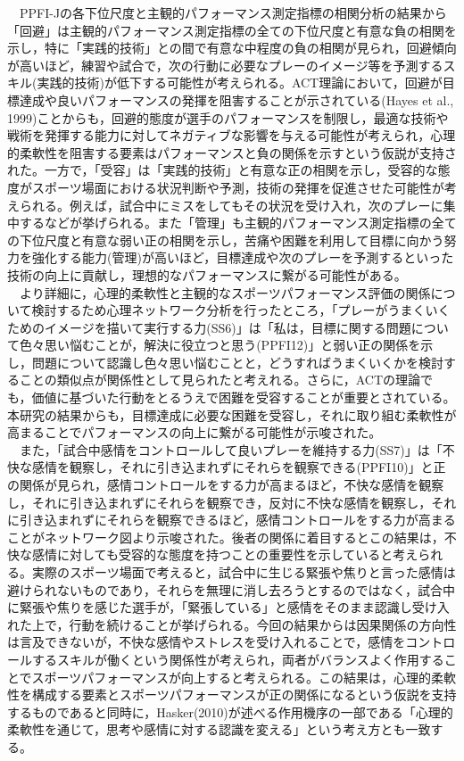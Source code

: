 \documentclass[12pt,a4paper,xelatex,ja=standard]{bxjsarticle}
\begin{document}
　PPFI-Jの各下位尺度と主観的パフォーマンス測定指標の相関分析の結果から「回避」は主観的パフォーマンス測定指標の全ての下位尺度と有意な負の相関を示し，特に「実践的技術」との間で有意な中程度の負の相関が見られ，回避傾向が高いほど，練習や試合で，次の行動に必要なプレーのイメージ等を予測するスキル(実践的技術)が低下する可能性が考えられる。ACT理論において，回避が目標達成や良いパフォーマンスの発揮を阻害することが示されている(Hayes
et al.,
1999)ことからも，回避的態度が選手のパフォーマンスを制限し，最適な技術や戦術を発揮する能力に対してネガティブな影響を与える可能性が考えられ，心理的柔軟性を阻害する要素はパフォーマンスと負の関係を示すという仮説が支持された。一方で，「受容」は「実践的技術」と有意な正の相関を示し，受容的な態度がスポーツ場面における状況判断や予測，技術の発揮を促進させた可能性が考えられる。例えば，試合中にミスをしてもその状況を受け入れ，次のプレーに集中するなどが挙げられる。また「管理」も主観的パフォーマンス測定指標の全ての下位尺度と有意な弱い正の相関を示し，苦痛や困難を利用して目標に向かう努力を強化する能力(管理)が高いほど，目標達成や次のプレーを予測するといった技術の向上に貢献し，理想的なパフォーマンスに繋がる可能性がある。\\
　より詳細に，心理的柔軟性と主観的なスポーツパフォーマンス評価の関係について検討するため心理ネットワーク分析を行ったところ，「プレーがうまくいくためのイメージを描いて実行する力(SS6)」は「私は，目標に関する問題について色々思い悩むことが，解決に役立つと思う(PPFI12)」と弱い正の関係を示し，問題について認識し色々思い悩むことと，どうすればうまくいくかを検討することの類似点が関係性として見られたと考えれる。さらに，ACTの理論でも，価値に基づいた行動をとるうえで困難を受容することが重要とされている。本研究の結果からも，目標達成に必要な困難を受容し，それに取り組む柔軟性が高まることでパフォーマンスの向上に繋がる可能性が示唆された。\\
　また，「試合中感情をコントロールして良いプレーを維持する力(SS7)」は「不快な感情を観察し，それに引き込まれずにそれらを観察できる(PPFI10)」と正の関係が見られ，感情コントロールをする力が高まるほど，不快な感情を観察し，それに引き込まれずにそれらを観察でき，反対に不快な感情を観察し，それに引き込まれずにそれらを観察できるほど，感情コントロールをする力が高まることがネットワーク図より示唆された。後者の関係に着目するとこの結果は，不快な感情に対しても受容的な態度を持つことの重要性を示していると考えられる。実際のスポーツ場面で考えると，試合中に生じる緊張や焦りと言った感情は避けられないものであり，それらを無理に消し去ろうとするのではなく，試合中に緊張や焦りを感じた選手が，「緊張している」と感情をそのまま認識し受け入れた上で，行動を続けることが挙げられる。今回の結果からは因果関係の方向性は言及できないが，不快な感情やストレスを受け入れることで，感情をコントロールするスキルが働くという関係性が考えられ，両者がバランスよく作用することでスポーツパフォーマンスが向上すると考えられる。この結果は，心理的柔軟性を構成する要素とスポーツパフォーマンスが正の関係になるという仮説を支持するものであると同時に，Hasker(2010)が述べる作用機序の一部である「心理的柔軟性を通じて，思考や感情に対する認識を変える」という考え方とも一致する。\\
\end{document}
